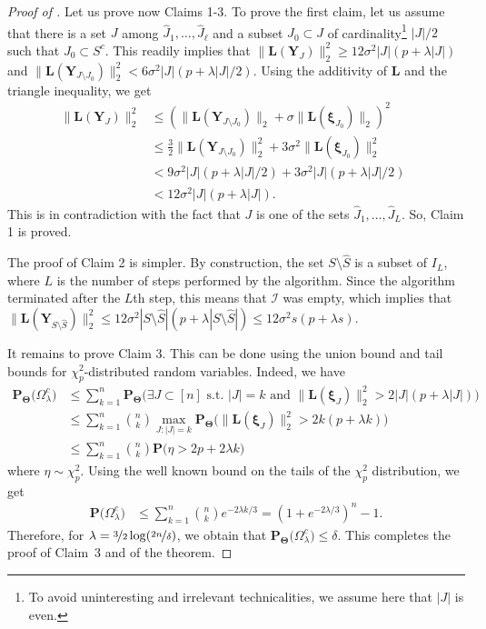 \documentclass[sts,preprint,reqno,a4paper]{imsart}
\def\l{\lambda}
\def\bxi{\boldsymbol\xi}
\def\bL{\boldsymbol L}
\def\bfY{\mathbf Y}
\def\bfT{\mathbf\Theta}
\def\prob{\mathbf P}
\def\calI{\mathcal I}
\def\hat{\widehat}
\theoremstyle{plain}
\theoremstyle{remark}
\theoremstyle{definition}
\begin{document}
\begin{proof}[Proof of ]
Let us prove now Claims 1-3. To prove the first claim, let us assume that there is a set $J$ among $\hat J_1,\ldots,\hat J_\ell$ and a subset $J_0\subset J$ of cardinality\footnote{To avoid uninteresting and irrelevant technicalities, we assume here that $|J|$ is even.} $|J|/2$ such that $J_0\subset S^c$. This readily implies that $\|\bL(\bfY_{J})\|_2^2\ge 12\sigma^2 |J|(p+\l |J|)$ and $\|\bL(\bfY_{J\setminus J_0})\|_2^2< 6\sigma^2 |J|(p+\l |J|/2)$. Using the additivity of $\bL$ and the triangle inequality, we get
\begin{align}
\|\bL(\bfY_{J})\|_2^2
    & \le (\|\bL(\bfY_{J\setminus J_0})\|_2+ \sigma\|\bL(\bxi_{J_0})\|_2)^2 \phantom{\frac32} \\
    & \le \frac32\|\bL(\bfY_{J\setminus J_0})\|_2^2+ 3\sigma^2\|\bL(\bxi_{J_0})\|_2^2\\
    & < 9\sigma^2 |J|(p+\l |J|/2)+ 3\sigma^2 |J|(p+\l|J|/2) \phantom{\frac32}\\
    & < 12\sigma^2 |J|(p+\l|J|). \phantom{\frac32}
\end{align}
This is in contradiction with the fact that $J$ is one of the sets $\hat J_1,\ldots,\hat J_L$. So, Claim 1 is proved.

The proof of Claim 2 is simpler. By construction, the set $S\setminus \hat S$ is a subset of $I_L$, where $L$ is the number of steps performed by the algorithm. Since the algorithm terminated after the $L$th step, this means that $\calI$ was empty, which implies  that $\|\bL(\bfY_{S\setminus\hat S})\|_2^2\le 12\sigma^2 |S\setminus\hat S|(p+\l|S\setminus\hat S|) \le 12\sigma^2 s(p+\l s)$.

It remains to prove Claim 3. This can be done using the union bound and tail bounds for $\chi^2_p$-distributed random variables. Indeed, we have
\begin{align}
\prob_\bfT\big(\Omega_\lambda^c\big)
    &\le \sum_{k=1}^n \prob_\bfT\big(\exists J\subset [n]\text{ s.t. } |J|=k\text{ and }
            \|\bL(\bxi_J)\|_2^2> 2|J|(p+\l|J|)\big)\\
    &\le \sum_{k=1}^n {{n}\choose{k}} \max_{J:|J|=k}
            \prob_\bfT\big(\|\bL(\bxi_J)\|_2^2> 2k(p+\l k)\big)\\
    &\le \sum_{k=1}^n {{n}\choose{k}}
            \prob\big(\eta > 2p + 2 \l k\big)
\end{align}
where $\eta\sim \chi^2_p$. Using the well known bound on the tails of the $\chi^2_p$
distribution, we get
\begin{align}
\prob\big(\Omega_\lambda^c\big)
    &\le \sum_{k=1}^n {{n}\choose{k}} e^{-2\l k/3} = (1+e^{-2\l/3})^n-1.
\end{align}
Therefore, for $\lambda = \nicefrac32\log(\nicefrac{2n}{\delta})$, we obtain that  $\prob_\bfT\big(\Omega_\lambda^c\big)\le \delta$. This completes the proof of Claim~3 and of the theorem.
\end{proof}
\end{document}
